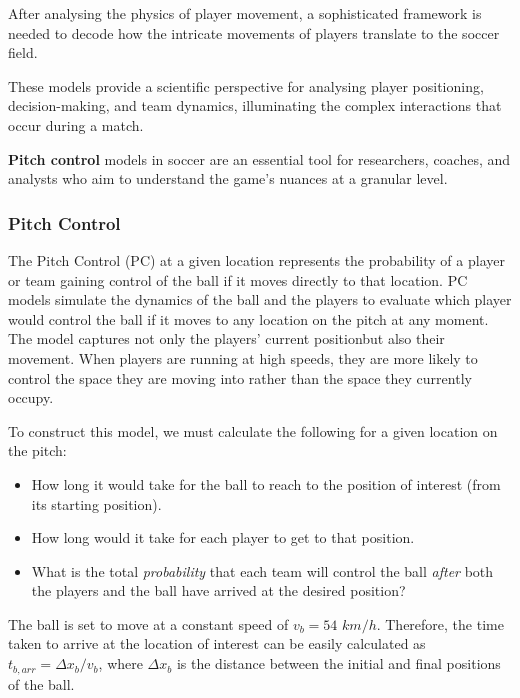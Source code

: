 \documentclass[twoside,nohyper]{tufte-book}
\begin{document}
After analysing the physics of player movement, a sophisticated
framework is needed to decode how the intricate movements of players
translate to the soccer field.

These models provide a scientific perspective for analysing player
positioning, decision-making, and team dynamics, illuminating the
complex interactions that occur during a match.

\textbf{Pitch control} models \citep{Spearman} in soccer are an essential tool for
researchers, coaches, and analysts who aim to understand the game's
nuances at a granular level.

\hypertarget{pitch-control}{%
\subsubsection{Pitch Control}\label{pitch-control}}

The Pitch Control (PC) at a given location represents the probability of
a player or team gaining control of the ball if it moves directly to
that location. PC models simulate the dynamics of the ball and the
players to evaluate which player would control the ball if it moves to
any location on the pitch at any moment. The model captures not only the
players' current positionbut also their movement. When players are
running at high speeds, they are more likely to control the space they
are moving into rather than the space they currently occupy.

To construct this model, we must calculate the following for a given
location on the pitch:

\begin{itemize}
\item
  How long it would take for the ball to reach to the position of
  interest (from its starting position).
\item
  How long would it take for each player to get to that position.
\item
  What is the total \emph{probability} that each team will control the ball
  \emph{after} both the players and the ball have arrived at the desired
  position?
\end{itemize}

The ball is set to move at a constant speed of \(v_b = 54\) \(km/h\).
Therefore, the time taken to arrive at the location of interest can be
easily calculated as \(t_{b,arr} = \Delta x_b/v_b\), where \(\Delta x_b\) is
the distance between the initial and final positions of the ball.
\end{document}
